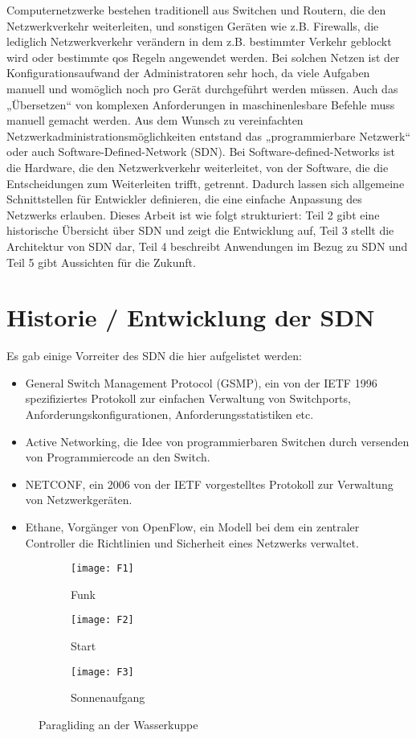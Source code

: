 \documentclass[twoside,12pt]{scrartcl}
\begin{document}
	
	Computernetzwerke bestehen traditionell aus Switchen und Routern, die den Netzwerkverkehr weiterleiten, und sonstigen Geräten wie z.B. Firewalls, die lediglich Netzwerkverkehr verändern in dem z.B. bestimmter Verkehr geblockt wird oder bestimmte qos Regeln angewendet werden. Bei solchen Netzen ist der Konfigurationsaufwand der Administratoren sehr hoch, da viele Aufgaben manuell und womöglich noch pro Gerät durchgeführt werden müssen. Auch das „Übersetzen“ von komplexen Anforderungen in maschinenlesbare Befehle muss manuell gemacht werden.
Aus dem Wunsch zu vereinfachten Netzwerkadministrationsmöglichkeiten entstand das „programmierbare Netzwerk“ oder auch Software-Defined-Network (SDN). Bei Software-defined-Networks ist die Hardware, die den Netzwerkverkehr weiterleitet, von der Software, die die Entscheidungen zum Weiterleiten trifft, getrennt. Dadurch lassen sich allgemeine Schnittstellen für Entwickler definieren, die eine einfache Anpassung des Netzwerks erlauben.
Dieses Arbeit ist wie folgt strukturiert: Teil 2 gibt eine historische Übersicht über SDN und zeigt die Entwicklung auf, Teil 3 stellt die Architektur von SDN dar, Teil 4 beschreibt Anwendungen im Bezug zu SDN und Teil 5 gibt Aussichten für die Zukunft.
	\section{Historie / Entwicklung der SDN}
	
	Es gab einige Vorreiter des SDN die hier aufgelistet werden:
	
	\begin{itemize}
		\item General Switch Management Protocol (GSMP), ein von der IETF 1996 spezifiziertes Protokoll zur einfachen Verwaltung von Switchports, Anforderungskonfigurationen, Anforderungsstatistiken etc.
		\item Active Networking, die Idee von programmierbaren Switchen durch versenden von Programmiercode an den Switch.
		\item NETCONF, ein 2006 von der IETF vorgestelltes Protokoll zur Verwaltung von Netzwerkgeräten.
		\item Ethane, Vorgänger von OpenFlow, ein Modell bei dem ein zentraler Controller die Richtlinien und Sicherheit eines Netzwerks verwaltet.
	\end{itemize}
	
\begin{figure}
	\centering
	\begin{subfigure}[t]{.3\linewidth}
		\texttt{[image: F1]}
		\caption{Funk}
		\label{fig:sub1}
	\end{subfigure}%
	\hfill
	\begin{subfigure}[t]{.3\linewidth}
		\texttt{[image: F2]}
		\caption{Start}
		\label{fig:sub2}
	\end{subfigure}
	\hfill
	\begin{subfigure}[t]{.3\linewidth}
		\texttt{[image: F3]}
		\caption{Sonnenaufgang}
		\label{fig:sub3}
	\end{subfigure}%
	\caption{Paragliding an der Wasserkuppe}
	\label{fig:paragliding}
\end{figure}
	
\end{document}

